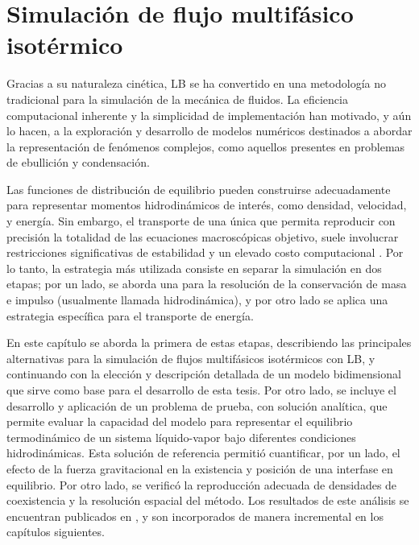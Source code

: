 \chapter{Simulaci\'on de flujo multif\'asico isot\'ermico}
\label{chap:isot}

Gracias a su naturaleza cin\'etica, LB se ha convertido en una metodolog\'ia no tradicional para la simulaci\'on de la mec\'anica de fluidos. La eficiencia computacional inherente y la simplicidad de implementaci\'on han motivado, y a\'un lo hacen, a la exploraci\'on y desarrollo de modelos num\'ericos destinados a abordar la representaci\'on de fen\'omenos complejos, como aquellos presentes en problemas de ebullici\'on y condensaci\'on.

Las funciones de distribuci\'on de equilibrio pueden construirse adecuadamente para representar momentos hidrodin\'amicos de inter\'es, como densidad, velocidad, y energ\'ia. Sin embargo, el transporte de una \'unica \fdp{} que permita reproducir con precisi\'on la totalidad de las ecuaciones macrosc\'opicas objetivo, suele involucrar restricciones significativas de estabilidad y un elevado costo computacional \cite{guo_lattice_2013}. Por lo tanto, la estrategia m\'as utilizada consiste en separar la simulaci\'on en dos etapas; por un lado, se aborda una \lbe{} para la resoluci\'on de la conservaci\'on de masa e impulso (usualmente llamada \lbe{} hidrodin\'amica), y por otro lado se aplica una estrategia espec\'ifica para el transporte de energ\'ia.

En este cap\'itulo se aborda la primera de estas etapas, describiendo las principales alternativas para la simulaci\'on de flujos multif\'asicos isot\'ermicos con LB, y continuando con la elecci\'on y descripci\'on detallada de un modelo bidimensional que sirve como base para el desarrollo de esta tesis. Por otro lado, se incluye el desarrollo y aplicaci\'on  de un problema de prueba, con soluci\'on anal\'itica, que permite evaluar la capacidad del modelo para representar el equilibrio termodin\'amico de un sistema l\'iquido-vapor bajo diferentes condiciones hidrodin\'amicas. Esta soluci\'on de referencia permiti\'o cuantificar, por un lado, el efecto de la fuerza gravitacional en la existencia y posici\'on de una interfase en equilibrio. Por otro lado, se verific\'o la reproducci\'on adecuada de densidades de coexistencia y la resoluci\'on espacial del m\'etodo. Los resultados de este an\'alisis se encuentran publicados en \cite{fogliatto_simulation_2019}, y son incorporados de manera incremental en los cap\'itulos siguientes.

